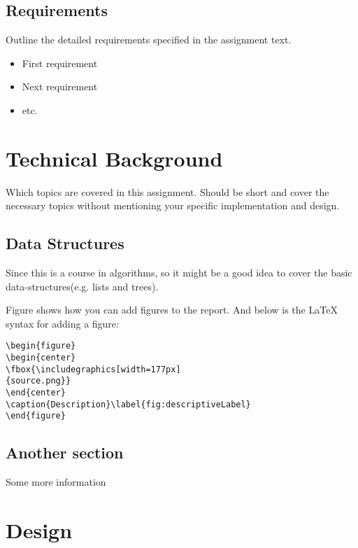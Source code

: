\subsection{Requirements}

Outline the detailed requirements specified in the assignment text.

\begin{itemize}

\item First requirement
\item Next requirement
\item etc.

\end{itemize}


\section{Technical Background}

Which topics are covered in this assignment. Should be short and cover the necessary topics without mentioning your specific implementation and design.

\subsection{Data Structures}

Since this is a course in algorithms, so it might be a good idea to cover the basic data-structures(e.g. lists and trees). 

Figure shows how you can add figures to the report. And below is the LaTeX syntax for adding a figure:

\begin{verbatim}
\begin{figure}
\begin{center}
\fbox{\includegraphics[width=177px]
{source.png}}
\end{center}
\caption{Description}\label{fig:descriptiveLabel}
\end{figure}
\end{verbatim}

\subsection{Another section}

Some more information

\section{Design}

